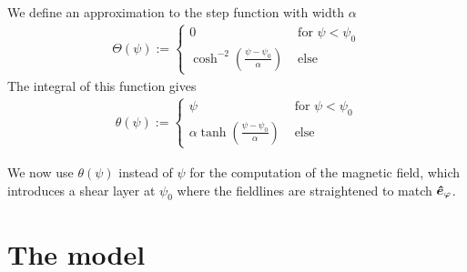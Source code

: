 We define an approximation to the step function with width $\alpha$
\begin{align}
\Theta(\psi) := \begin{cases}
0 &\text{ for } \psi < \psi_0 \\
\cosh^{-2}\left( \frac{\psi-\psi_0}{\alpha}  \right) &\text{ else}
\end{cases}
\label{}
\end{align}
The integral of this function gives
\begin{align}
\theta(\psi) := \begin{cases}
\psi &\text{ for } \psi < \psi_0 \\
\alpha \tanh\left( \frac{\psi-\psi_0}{\alpha}  \right) &\text{ else}
\end{cases}
\label{eq:modified_psi}
\end{align}

We now use $\theta(\psi)$ instead of $\psi$ for the computation of the
magnetic field, which introduces a shear layer at $\psi_0$ where the
fieldlines are straightened to match $\bm{\hat{e}}_\varphi$.

\section{The model} \label{sec:model}
